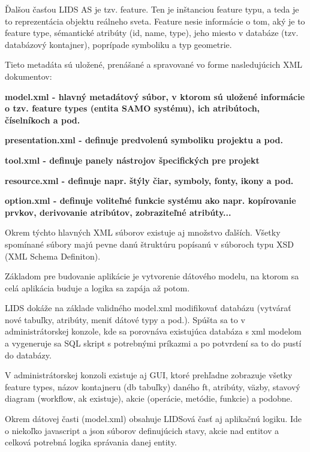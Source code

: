 Ďalšou časťou LIDS AS je tzv. feature. Ten je inštanciou feature typu, a teda je to reprezentácia objektu reálneho sveta. Feature nesie informácie o tom, aký je to feature type, sémantické atribúty (id, name, type), jeho miesto v databáze (tzv. databázový kontajner), poprípade symboliku a typ geometrie.

Tieto metadáta sú uložené, prenášané a spravované vo forme nasledujúcich XML dokumentov:

\startitemize
\item{\start \bf model.xml \stop - hlavný metadátový súbor, v ktorom sú uložené informácie o tzv. feature types (entita SAMO systému), ich atribútoch, číselníkoch a pod.}
\item{\start \bf presentation.xml \stop - definuje predvolenú symboliku projektu a pod.}
\item{\start \bf tool.xml \stop - definuje panely nástrojov špecifických pre projekt}
\item{\start \bf resource.xml \stop - definuje napr. štýly čiar, symboly, fonty, ikony a pod.}
\item{\start \bf option.xml \stop - definuje voliteľné funkcie systému ako napr. kopírovanie prvkov, derivovanie atribútov, zobraziteľné atribúty...}
\stopitemize 

Okrem týchto hlavných XML súborov existuje aj množstvo ďalších. Všetky spomínané súbory majú pevne danú štruktúru popísanú v súboroch typu XSD (XML Schema Definiton). 

Základom pre budovanie aplikácie je vytvorenie dátového modelu, na ktorom sa celá aplikácia buduje a logika sa zapája až potom. 

LIDS dokáže na základe validného model.xml modifikovať databázu (vytvárať nové tabuľky, atribúty, meniť dátové typy a pod.). Spúšta sa to v administrátorskej konzole, kde sa porovnáva existujúca databáza s xml modelom a vygeneruje sa SQL skript s potrebnými príkazmi a po potvrdení sa to do pustí do databázy.

V administrátorskej konzoli existuje aj GUI, ktoré prehľadne zobrazuje všetky feature types, názov kontajneru (db tabuľky) daného ft, atribúty, väzby, stavový diagram (workflow, ak existuje), akcie (operácie, metódie, funkcie) a podobne. 

Okrem dátovej časti (model.xml) obsahuje LIDSová časť aj aplikačnú logiku. Ide o niekoľko javascript a json súborov definujúcich stavy, akcie nad entitov a celková potrebná logika správania danej entity.

